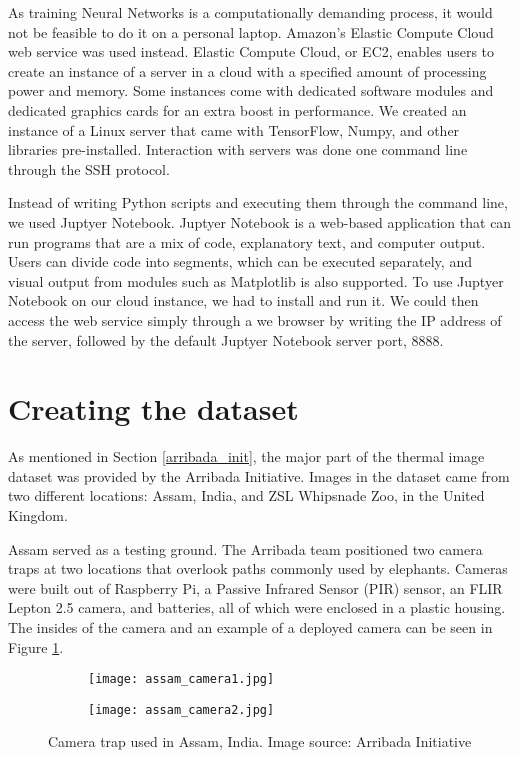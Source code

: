 As training Neural Networks is a computationally demanding process, it would not be feasible to do it on a personal laptop.
Amazon's Elastic Compute Cloud web service was used instead.
Elastic Compute Cloud, or EC2, enables users to create an instance of a server in a cloud with a specified amount of processing power and memory.
Some instances come with dedicated software modules and dedicated graphics cards for an extra boost in performance.
We created an instance of a Linux server that came with TensorFlow, Numpy, and other libraries pre-installed.
Interaction with servers was done one command line through the SSH protocol.

Instead of writing Python scripts and executing them through the command line, we used Juptyer Notebook. 
Juptyer Notebook is a web-based application that can run programs that are a mix of code, explanatory text, and computer output.
Users can divide code into segments, which can be executed separately, and visual output from modules such as Matplotlib is also supported.
To use Juptyer Notebook on our cloud instance, we had to install and run it.
We could then access the web service simply through a we browser by writing the IP address of the server, followed by the default Juptyer Notebook server port, 8888.


\section{ Creating the dataset}

As mentioned in Section \ref{arribada_init}, the major part of the thermal image dataset was provided by the Arribada Initiative\cite{wildlabs-winners}\cite{arribada-assam}.
Images in the dataset came from two different locations: Assam, India, and ZSL Whipsnade Zoo, in the United Kingdom.

Assam served as a testing ground.
The Arribada team positioned two camera traps at two locations that overlook paths commonly used by elephants.
Cameras were built out of Raspberry Pi, a Passive Infrared Sensor (PIR) sensor, an FLIR Lepton 2.5 camera, and batteries, all of which were enclosed in a plastic housing.
The insides of the camera and an example of a deployed camera can be seen in Figure \ref{assam_camera}.
\newline
\begin{figure}[ht]
    \begin{subfigure}{0.5\textwidth}
        \centering
        \texttt{[image: assam\_camera1.jpg]} 
    \end{subfigure}
    \begin{subfigure}{0.5\textwidth}
        \centering
        \texttt{[image: assam\_camera2.jpg]}
    \end{subfigure}
    \caption[Camera trap used in Assam, India.]{Camera trap used in Assam, India. Image source: Arribada Initiative\cite{arribada-assam}}
    \label{assam_camera}
\end{figure}

